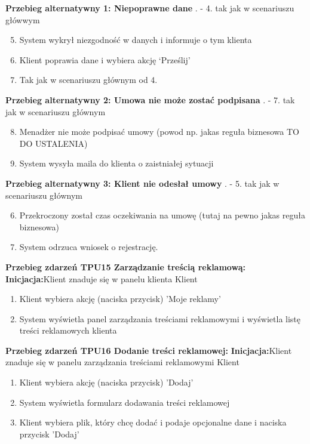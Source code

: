 \documentclass[10pt,a4paper,titlepage]{article} %
\begin{document}
		{\bf Przebieg alternatywny 1: Niepoprawne dane} . - 4. tak jak w scenariuszu główwym
			\begin{enumerate}
			  \setcounter{enumi}{4}
			  \item System wykrył niezgodność w danych i informuje o tym klienta
			  \item Klient poprawia dane i wybiera akcję `Prześlij'
			  \item Tak jak w scenariuszu głównym od 4.
			\end{enumerate}
			
	   {\bf Przebieg alternatywny 2: Umowa nie może zostać podpisana} . - 7. tak jak w scenariuszu głównym
			\begin{enumerate}
			  \setcounter{enumi}{7}
			  \item Menadżer nie może podpisać umowy (powod np. jakas reguła biznesowa
			  TO DO USTALENIA)
			  \item System wysyła maila do klienta o zaistniałej sytuacji
			\end{enumerate}
			
		{\bf Przebieg alternatywny 3: Klient nie odesłał umowy} . - 5. tak jak w scenariuszu głównym
			\begin{enumerate}
			  \setcounter{enumi}{5}
			  \item Przekroczony został czas oczekiwania na umowę (tutaj na pewno jakas
			  reguła biznesowa)
			  \item System odrzuca wniosek o rejestrację.
			\end{enumerate}
		
		{\bf Przebieg zdarzeń TPU15 Zarządzanie treścią reklamową:}\newline
		{\bf Inicjacja:}Klient znaduje się w panelu klienta
		 Klient
			\begin{enumerate}
			  \item Klient wybiera akcję (naciska przycisk) 'Moje reklamy'
			  \item System wyświetla panel zarządzania treściami reklamowymi i wyświetla
			   listę treści reklamowych klienta
			\end{enumerate}
		
		{\bf Przebieg zdarzeń TPU16 Dodanie treści reklamowej:}\newline
		{\bf Inicjacja:}Klient znaduje się w panelu zarządzania treściami reklamowymi
		 Klient
			\begin{enumerate}
			  \item Klient wybiera akcję (naciska przycisk) 'Dodaj'
			  \item System wyświetla formularz dodawania treści reklamowej
			  \item Klient wybiera plik, który chcę dodać i podaje opcjonalne dane i
			  naciska przycisk 'Dodaj'
			\end{enumerate}
			
\end{document}
